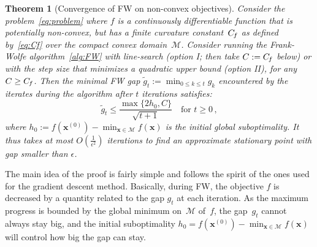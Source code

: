 \documentclass{article}
\newcommand{\x}{\bm{x}}
\newtheorem{theorem}[definition]{Theorem}
\newcommand{\domain}{\mathcal{M}} %
\newcommand{\Cf}{C_{\hspace{-0.08em}f}}
\newcommand{\0}{\mathbf{0}} %
\begin{document}
\begin{theorem}[Convergence of FW on non-convex objectives] \label{thm:gConvergence}
Consider the problem~\eqref{eq:problem} where $f$ is a continuously differentiable function that is potentially non-convex, but has a finite curvature constant~$\Cf$ as defined by~\eqref{eq:Cf} over the \emph{compact} convex domain~$\domain$. Consider running the Frank-Wolfe algorithm~\ref{alg:FW} with line-search (option I; then take $C := \Cf$ below) or with the step size that minimizes a quadratic upper bound (option II), for any $C \geq \Cf$. Then the minimal FW gap $\tilde{g}_t := \displaystyle \min_{0 \leq k \leq t} g_k$ encountered by the iterates during the algorithm after $t$ iterations satisfies: \vspace{-1mm}
\begin{equation} \label{eq:gBound}
\tilde{g}_t \leq \frac{\max\{2 h_0, C\} }{\sqrt{t+1}}  \quad \text{for $t \geq 0$} \, ,
\end{equation}
where $h_0 := f(\x^{(0)}) - \displaystyle \min_{\x \in \domain} f(\x)$ is the initial global suboptimality. It thus takes at most $O(\frac{1}{\epsilon^2})$ iterations to find an approximate stationary point with gap smaller than $\epsilon$.
\end{theorem}

The main idea of the proof is fairly simple and follows the spirit of the ones used for the gradient descent method. Basically, during FW, the objective $f$ is decreased by a quantity related to the gap $g_t$ at each iteration. As the maximum progress is bounded by the global minimum on~$\domain$ of~$f$, the gap~$g_t$ cannot always stay big, and the initial suboptimality $h_0 = f(\x^{(0)}) - \min_{\x \in \domain} f(\x)$ will control how big the gap can stay.
\end{document}
